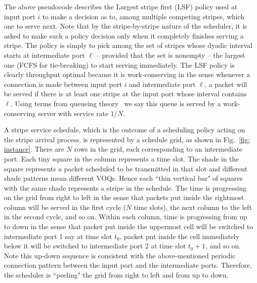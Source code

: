 The above pseudocode describes the Largest stripe first (LSF) policy used at input port $i$ to make
a decision as to, among multiple competing stripes, which one to serve next.   
Note that by the stripe-by-stripe nature of the scheduler, it is asked to make such a policy decision only 
when it completely finishes serving a stripe.
The policy is simply to pick among the set of stripes
whose dyadic
interval starts at intermediate port $\ell$ -- provided that the set is nonempty --  the largest one (FCFS for tie-breaking) to start serving immediately.  
The LSF policy is clearly throughput optimal because it is work-conserving in the sense whenever a connection is made between input port $i$ and intermediate port $\ell$, a packet will be served
if there is at least one stripe at the input port 
whose interval contains $\ell$.  
Using terms from queueing theory~\cite{kleinrock1975queueing}
we say this queue is served by a work-conserving server with service rate $1/N$.


























A stripe service schedule, which is the outcome of a scheduling policy acting on the stripe arrival process, 
is represented by a schedule grid, as shown in Fig.~\ref{fig: instance}.
There are $N$ rows in the grid, each corresponding
to an intermediate port.  Each tiny square in the column represents a time slot. 
The shade in the square represents a packet scheduled to be transmitted in that slot and
different shade patterns mean different VOQs.  Hence each ``thin vertical bar" of squares with the same shade 
represents a stripe in the schedule.
The time is progressing
on the grid from right to left in the sense that packets put inside the rightmost column 
will be served in the first cycle ($N$ time slots), the next column to the left in the second
cycle, and so on.  Within each column, time is progressing from up to down in the sense
that packet put inside the uppermost cell will be switched to intermediate port 1 say at
time slot $t_0$, packet put inside the cell immediately below it will be switched to intermediate
port 2 at time slot $t_0+1$, and so on.  Note this up-down sequence is consistent with the above-mentioned
periodic connection pattern between the input port and the intermediate ports.
Therefore, the scheduler is ``peeling" the grid from right to left and from up to down.

